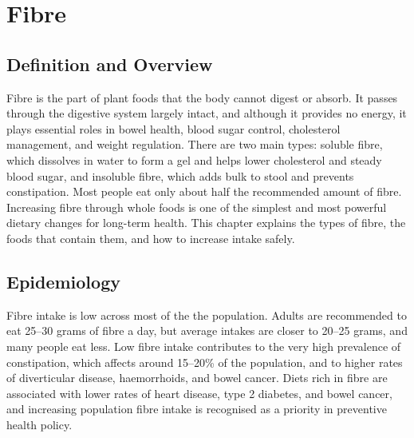\chapter{Fibre}

\section*{Definition and Overview}
Fibre is the part of plant foods that the body cannot digest or absorb. It passes through the digestive system largely intact, and although it provides no energy, it plays essential roles in bowel health, blood sugar control, cholesterol management, and weight regulation. There are two main types: soluble fibre, which dissolves in water to form a gel and helps lower cholesterol and steady blood sugar, and insoluble fibre, which adds bulk to stool and prevents constipation. Most people eat only about half the recommended amount of fibre. Increasing fibre through whole foods is one of the simplest and most powerful dietary changes for long-term health. This chapter explains the types of fibre, the foods that contain them, and how to increase intake safely.

\section*{Epidemiology}
Fibre intake is low across most of the the population. Adults are recommended to eat 25--30 grams of fibre a day, but average intakes are closer to 20--25 grams, and many people eat less. Low fibre intake contributes to the very high prevalence of constipation, which affects around 15--20\% of the population, and to higher rates of diverticular disease, haemorrhoids, and bowel cancer. Diets rich in fibre are associated with lower rates of heart disease, type 2 diabetes, and bowel cancer, and increasing population fibre intake is recognised as a priority in preventive health policy.

